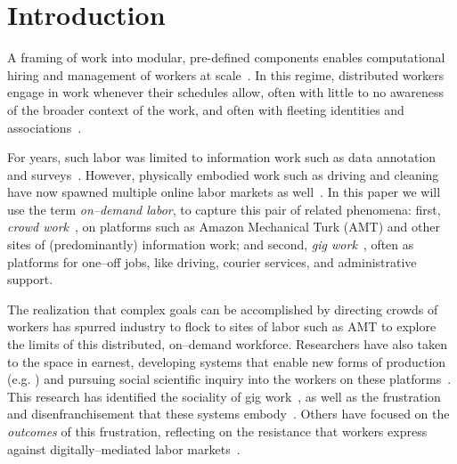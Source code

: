 \documentclass[trackingWork]{subfiles}
\begin{document}
\section{Introduction}\label{sec:introduction}

A framing of work into modular, pre-defined components
enables computational hiring and management of workers at scale~\cite{howe2008crowdsourcing,Bigham2014,crowdworkFuture}.
In this regime, distributed workers engage in work whenever their schedules allow,
often with little to no awareness of the broader context of the work, and
often with fleeting identities and associations~\cite{martin2014being,uberAlgorithm}.

For years, such labor was limited to information work such as data annotation and surveys~\cite{CrowdsourcingUserStudies,movieSummarizationWu,yuenSurvey,geiger2011managing,quinnbedersonTaxonomy}.
However, physically embodied work such as driving and cleaning have now spawned multiple online labor markets as well~\cite{uberAlgorithm,uberOfficial,zaarlyOfficial,taskrabbitOfficial}.
In this paper we will use the term \textit{on--demand labor}, to capture this pair of related phenomena:
first, \textit{crowd work}~\cite{crowdworkFuture}, on platforms such as Amazon Mechanical Turk (AMT) and other sites of (predominantly) information work;
and second, \textit{gig work}~\cite{friedman2014workers}, often as platforms for one--off jobs, like driving, courier services, and administrative support.

The realization that complex goals can be accomplished by directing crowds of workers has spurred industry to flock to sites of labor
such as AMT to explore the limits of this distributed, on--demand workforce.
Researchers have also taken to the space in earnest,
developing systems that enable new forms of production
(e.g. \cite{bernsteinSoylent,vizwiz,paolacci2010running}) and pursuing social scientific inquiry into the workers on these platforms~\cite{Ross,whoareNOTtheTurkers}.
This research has identified the sociality of gig work~\cite{crowdcollab},
as well as the frustration and disenfranchisement that these systems embody~\cite{turkopticon,martin2014being,takingAHITMcInnis}.
Others have focused on the \textit{outcomes} of this frustration,
reflecting on the resistance that workers express against digitally--mediated labor markets~\cite{uberAlgorithm,dynamo}.
\end{document}
